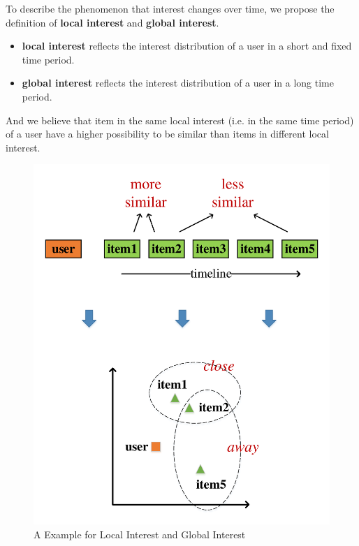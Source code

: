 \documentclass{sig-alternate-05-2015}
\begin{document}
To describe the phenomenon that interest changes over time,
we propose the definition of \textbf{local interest} and \textbf{global interest}.

\begin{itemize}
\item \textbf{local interest} reflects the interest distribution of a user
in a short and fixed time period.
\item \textbf{global interest} reflects the interest distribution of a user
in a long time period.
\end{itemize}

And we believe that item in the same local interest (i.e. in the same time period)
of a user have a higher possibility to be similar than
items in different local interest.

\begin{figure}[htbp]
	\centering
	\includegraphics[scale=0.5]{images/embedding.pdf}
	\caption{A Example for Local Interest and Global Interest}
	\label{fig:embedding}
\end{figure}
\end{document}
